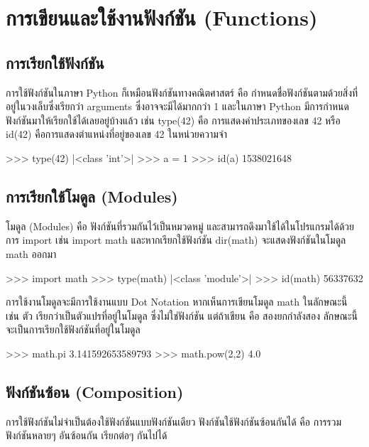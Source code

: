 \chapter{การเขียนและใช้งานฟังก์ชัน (Functions)}
\section{การเรียกใช้ฟังก์ชัน}

การใช้ฟังก์ชันในภาษา Python ก็เหมือนฟังก์ชันทางคณิตศาสตร์ คือ กำหนดชื่อฟังก์ชันตามด้วยสิ่งที่อยู่ในวงเล็บซึ่งเรียกว่า arguments ซึ่งอาจจะมีได้มากกว่า 1 และในภาษา Python มีการกำหนดฟังก์ชันมาให้เรียกใช้ได้เลยอยู่บ้างแล้ว เช่น type(42) คือ การแสดงค่าประเภทของเลข 42 หรือ id(42) คือการแสดงตำแหน่งที่อยู่ของเลข 42 ในหน่วยความจำ

\begin{pycode}
>>> type(42)
|<class \rq{}int\rq{}>|
>>> a = 1
>>> id(a)
1538021648
\end{pycode}


\section{การเรียกใช้โมดูล (Modules)}

โมดูล (Modules) คือ ฟังก์ชันที่รวมกันไว้เป็นหมวดหมู่ และสามารถดึงมาใช้ได้ในโปรแกรมได้ด้วยการ import เช่น import math และหากเรียกใช้ฟังก์ชัน dir(math) จะแสดงฟังก์ชันในโมดูล math ออกมา 

\begin{pycode}
>>> import math
>>> type(math)
|<class \rq{}module\rq{}>|
>>> id(math)
56337632

\end{pycode}


การใช้งานโมดูลจะมีการใช้งานแบบ Dot Notation หากเห็นการเขียนโมดูล math ในลักษณะนี้ เช่น   ตัว   เรียกว่าเป็นตัวแปรที่อยู่ในโมดูล   ซึ่งไม่ใช่ฟังก์ชัน แต่ถ้าเขียน   คือ สองยกกำลังสอง ลักษณะนี้จะเป็นการเรียกใช้ฟังก์ชันที่อยู่ในโมดูล

\begin{pycode}
>>> math.pi
3.141592653589793
>>> math.pow(2,2)
4.0
\end{pycode}


\section{ฟังก์ชันซ้อน (Composition)}

การใช้ฟังก์ชันไม่จำเป็นต้องใช้ฟังก์ชันแบบฟังก์ชันเดียว ฟังก์ชันใช้ฟังก์ชันซ้อนกันได้ คือ การรวมฟังก์ชันหลายๆ อันซ้อนกัน เรียกต่อๆ กันไปได้

